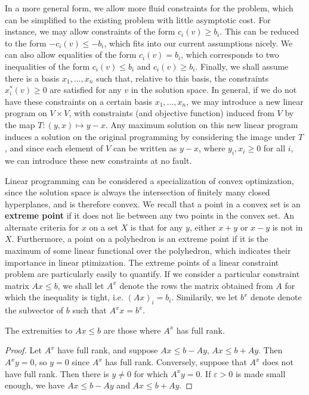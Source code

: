     In a more general form, we allow more fluid constraints for the problem, which can be simplified to the existing problem with little asymptotic cost. For instance, we may allow constraints of the form $c_i(v) \geq b_i$. This can be reduced to the form $-c_i(v) \leq -b_i$, which fits into our current assumptions nicely. We can also allow equalities of the form $c_i(v) = b_i$, which corresponds to two inequalities of the form $c_i(v) \leq b_i$ and $c_i(v) \geq b_i$. Finally, we shall assume there is a basis $x_1, \dots, x_n$ such that, relative to this basis, the constraints $x_i^*(v) \geq 0$ are satisfied for any $v$ in the solution space. In general, if we do not have these constraints on a certain basis $x_1, \dots, x_n$, we may introduce a new linear program on $V \times V$, with constraints (and objective function) induced from $V$ by the map $T: (y,x) \mapsto y-x$. Any maximum solution on this new linear program induces a solution on the original programming by considering the image under $T$, and since each element of $V$ can be written as $y - x$, where $y_i, x_i \geq 0$ for all $i$, we can introduce these new constraints at no fault.

    Linear programming can be considered a specialization of convex optimization, since the solution space is always the intersection of finitely many closed hyperplanes, and is therefore convex. We recall that a point in a convex set is an {\bf extreme point} if it does not lie between any two points in the convex set. An alternate criteria for $x$ on a set $X$ is that for any $y$, either $x + y$ or $x - y$ is not in $X$. Furthermore, a point on a polyhedron is an extreme point if it is the maximum of some linear functional over the polyhedron, which indicates their importance in linear ptimization. The extreme points of a linear constraint problem are particularly easily to quantify. If we consider a particular constraint matrix $Ax \leq b$, we shall let $A^x$ denote the rows the matrix obtained from $A$ for which the inequality is tight, i.e. $(Ax)_i = b_i$. Similarily, we let $b^x$ denote denote the subvector of $b$ such that $A^x x = b^x$.

    \begin{theorem}
        The extremities to $Ax \leq b$ are those where $A^x$ has full rank.
    \end{theorem}
    \begin{proof}
        Let $A^x$ have full rank, and suppose $Ax \leq b - Ay$, $Ax \leq b + Ay$. Then $A^x y = 0$, so $y = 0$ since $A^x$ has full rank. Conversely, suppose that $A^x$ does not have full rank. Then there is $y \neq 0$ for which $A^x y = 0$. If $\varepsilon > 0$ is made small enough, we have $Ax \leq b - Ay$ and $Ax \leq b + Ay$.
    \end{proof}

